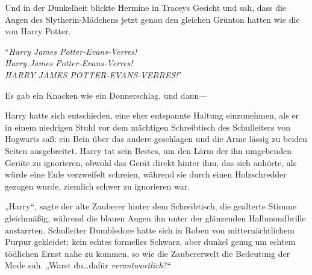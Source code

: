 Und in der Dunkelheit blickte Hermine in Traceys Gesicht und sah, dass die Augen des Slytherin-Mädchens jetzt genau den gleichen Grünton hatten wie die von Harry Potter.

“\emph{Harry James Potter-Evans-Verres!\\
Harry James Potter-Evans-Verres!\\
HARRY JAMES POTTER-EVANS-VERRES!}”

Es gab ein Knacken wie ein Donnerschlag, und dann—

\later

Harry hatte sich entschieden, eine eher entspannte Haltung einzunehmen, als er in einem niedrigen Stuhl vor dem mächtigen Schreibtisch des Schulleiters von Hogwarts saß: ein Bein über das andere geschlagen und die Arme lässig zu beiden Seiten ausgebreitet. Harry tat sein Bestes, um den Lärm der ihn umgebenden Geräte zu ignorieren, obwohl das Gerät direkt hinter ihm, das sich anhörte, als würde eine Eule verzweifelt schreien, während sie durch einen Holzschredder gezogen wurde, ziemlich schwer zu ignorieren war.

„Harry“, sagte der alte Zauberer hinter dem Schreibtisch, die gealterte Stimme gleichmäßig, während die blauen Augen ihn unter der glänzenden Halbmondbrille anstarrten. Schulleiter Dumbledore hatte sich in Roben von mitternächtlichem Purpur gekleidet; kein echtes formelles Schwarz, aber dunkel genug um echtem tödlichen Ernst nahe zu kommen, so wie die Zaubererwelt die Bedeutung der Mode sah. „Warst du…dafür \emph{verantwortlich}?“

